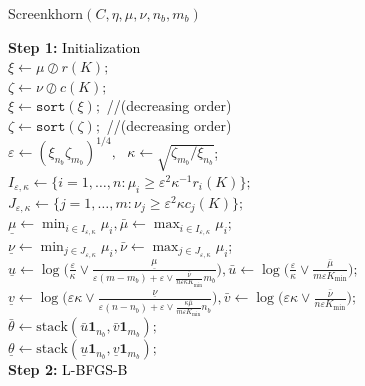\begin{algorithm}[htbp]
\DontPrintSemicolon
\caption{Screenkhorn$(C,\eta,\mu,\nu,n_b,m_b)$}
\label{screenkhorn}

\textbf{Step 1:} \textcolor{black}{Initialization}\\

\nl   $\xi \gets \mu \oslash r(K);$ \\
\nl   $\zeta \gets \nu \oslash c(K);$\\
\nl   $\xi \gets \texttt{sort}(\xi);$ //(decreasing order)\\
\nl   $\zeta \gets \texttt{sort}(\zeta);$ //(decreasing order)\\
\nl   $\varepsilon \gets (\xi_{n_b}\zeta_{m_b})^{1/4}, \text{  } \kappa \gets \sqrt{{\zeta_{m_b}}/{\xi_{n_b}}}$;\\
\nl   $I_{\varepsilon,\kappa} \gets \{i=1, \ldots, n: \mu_i \geq {\varepsilon^2} \kappa^{-1} r_i(K)\};$\\
\nl   $J_{\varepsilon,\kappa} \gets \{j=1, \ldots, m: \nu_j \geq \varepsilon^2\kappa c_j(K)\};$\\ 
\nl   $\underline{\mu} \gets \min_{i \in I_{\varepsilon,\kappa}} \mu_i, \bar{\mu} \gets \max_{i \in I_{\varepsilon,\kappa}} \mu_i$; \\
\nl   $\underline{\nu} \gets \min_{j \in J_{\varepsilon,\kappa}} \mu_i, \bar{\nu} \gets \max_{j \in J_{\varepsilon,\kappa}} \mu_i$; \\
\nl   $\underline{u} \gets \log\big(\frac \varepsilon\kappa \vee \frac{\underline{\mu}}{\varepsilon (m-m_b) + \varepsilon \vee \frac{\bar{\nu}}{n\varepsilon\kappa K_{\min}} m_b}\big), \bar{u} \gets  \log\big(\frac \varepsilon\kappa\vee \frac{\bar{\mu}}{m\varepsilon K_{\min}}\big);$\\
\nl   $\underline{v} \gets \log\big(\varepsilon\kappa \vee \frac{\underline{\nu}}{\varepsilon(n-n_b) + \varepsilon \vee \frac{\kappa\bar{\mu}}{m\varepsilon K_{\min}} n_b}\big), \bar{v} \gets \log\big(\varepsilon\kappa \vee \frac{\bar{\nu}}{n\varepsilon K_{\min}}\big);$\\
\nl   $ \bar{\theta} \gets \text{stack}(\bar{u}\mathbf 1_{n_b}, \bar{v}\mathbf 1_{m_b});$\\
\nl   $ \underline{\theta} \gets \text{stack}(\underline{u}\mathbf 1_{n_b}, \underline{v}\mathbf 1_{m_b}) ;$\\

\noindent \textbf{Step 2:} \textcolor{black}{L-BFGS-B}\\


\end{algorithm}
